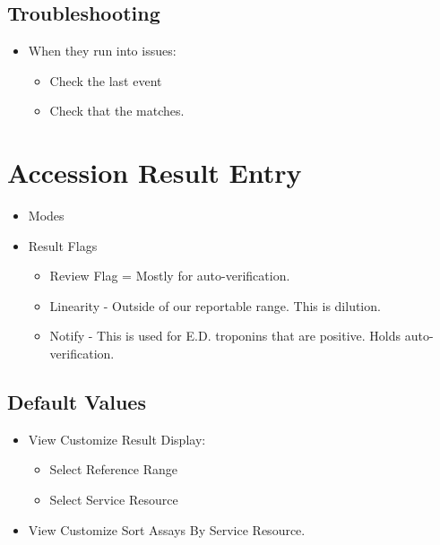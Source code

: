 \section{Troubleshooting}
\begin{itemize}
    \item When they run into issues:
    \begin{itemize}
        \item Check the last event 
        \item Check that the  matches.
    \end{itemize}
\end{itemize}






\chapter{Accession Result Entry}

\begin{itemize}
    \item Modes
    \item Result Flags
        \begin{itemize}
            \item Review Flag = Mostly for auto-verification.
            \item Linearity - Outside of our reportable range. This is  dilution.
            \item Notify - This is used for E.D. troponins that are positive. Holds auto-verification.
        \end{itemize}
\end{itemize}


\section{Default Values}
\begin{itemize}
    \item View \faArrowRight Customize Result Display:
    \begin{itemize}
        \item Select Reference Range
        \item Select Service Resource
    \end{itemize}
    \item View \faArrowRight Customize \faArrowRight Sort Assays \faArrowRight By Service Resource.
\end{itemize}

